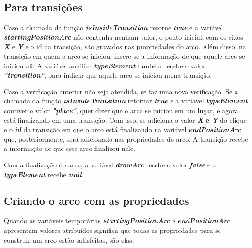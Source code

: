 \documentclass[
	12pt,				%
	openright,			%
	oneside,			%
	a4paper,			%
	english,			%
	brazil				%
	]{abntex2}
\begin{document}


\subsection*{Para transições}

Caso a chamada da função \textbf{\textit{isInsideTransition}} retorne \textbf{\textit{true}} e a variável \textbf{\textit{startingPositionArc}} não contenha nenhum valor, o ponto inicial, com os eixos \textbf{\textit{X}} e \textbf{\textit{Y}} e o id da transição, são gravados nas propriedades do arco. Além disso, na transição em quem o arco se iniciou, insere-se a informação de que aquele arco se iniciou ali. A variável auxiliar \textbf{\textit{typeElement}} também recebe o valor \textbf{\textit{"transition"}}, para indicar que aquele arco se iniciou numa transição. 

Caso a verificação anterior não seja atendida, se faz uma nova verificação. Se a chamada da função \textbf{\textit{isInsideTransition}} retornar \textbf{\textit{true}} e a variável \textbf{\textit{typeElement}} contiver o valor \textbf{\textit{"place"}}, quer dizer que o arco se iniciou em um lugar, e agora está finalizando em uma transição. Com isso, se adiciona o valor \textbf{\textit{X} e \textbf{\textit{Y}}} do clique e o \textbf{\textit{id}} da transição em que o arco está finalizando na variável \textbf{\textit{endPositionArc}} que, posteriormente, será adicionado nas propriedades do arco. A transição recebe a informação de que esse arco finalizou nele.

Com a finalização do arco, a variável \textbf{\textit{drawArc}} recebe o valor \textbf{\textit{false}} e a \textbf{\textit{typeElement}} recebe \textbf{\textit{null}}



\subsection*{Criando o arco com as propriedades}

Quando as variáveis temporárias \textbf{\textit{startingPositionArc}} e \textbf{\textit{endPositionArc}} apresentam valores atribuídos significa que todas as propriedades para se construir um arco estão satisfeitas, são elas:
\end{document}
